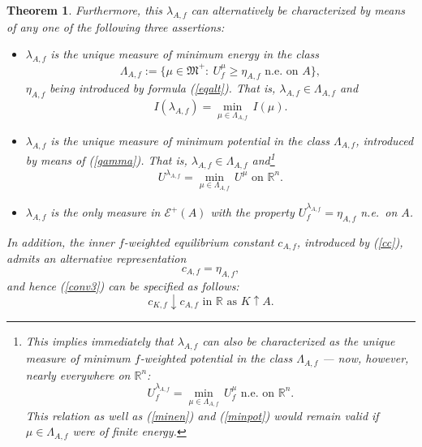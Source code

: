 \documentclass[12pt,a4paper,reqno]{amsart} %
\theoremstyle{lause}
\theoremstyle{maaritelma}
\theoremstyle{lause}
\newtheorem{theorem}{Theorem}[section]
\theoremstyle{maaritelma}
\numberwithin{equation}{section}
\begin{document}
\begin{theorem}
Furthermore, this $\lambda_{A,f}$ can alternatively be characterized by means of any one of the following three assertions:
\begin{itemize}
\item[{\rm(i)}] $\lambda_{A,f}$ is the unique measure of minimum energy in the class
\begin{equation}\label{gamma}
\Lambda_{A,f}:=\bigl\{\mu\in\mathfrak M^+: \ U^\mu_f\geqslant\eta_{A,f}\text{ \ n.e.\ on\ $A$}\bigr\},
  \end{equation}
$\eta_{A,f}$ being introduced by formula {\rm(\ref{eqalt})}. That is, $\lambda_{A,f}\in\Lambda_{A,f}$ and
\begin{equation}\label{minen}
I(\lambda_{A,f})=\min_{\mu\in\Lambda_{A,f}}\,I(\mu).
\end{equation}
\item[{\rm(ii)}] $\lambda_{A,f}$ is the unique measure of minimum potential in the class $\Lambda_{A,f}$, introduced by means of {\rm(\ref{gamma})}. That is, $\lambda_{A,f}\in\Lambda_{A,f}$ and\footnote{This implies immediately that
$\lambda_{A,f}$ can also be characterized as the unique measure of minimum $f$-we\-i\-g\-h\-t\-ed potential in the class $\Lambda_{A,f}$ --- now, however, nearly everywhere on $\mathbb R^n$: \begin{equation*} U^{\lambda_{A,f}}_f=\min_{\mu\in\Lambda_{A,f}}\,U^\mu_f\text{ \ n.e.\ on\ $\mathbb R^n$}.\end{equation*}
This relation as well as (\ref{minen}) and (\ref{minpot}) would remain valid if $\mu\in\Lambda_{A,f}$ were of finite energy.}
\begin{equation}\label{minpot}
U^{\lambda_{A,f}}=\min_{\mu\in\Lambda_{A,f}}\,U^\mu\text{ \ on\ $\mathbb R^n$}.
\end{equation}
\item[{\rm(iii)}] $\lambda_{A,f}$ is the only measure in $\mathcal E^+(A)$ with the property
$U^{\lambda_{A,f}}_f=\eta_{A,f}$ n.e.\ on $A$.
\end{itemize}

In addition, the inner $f$-weighted equilibrium constant $c_{A,f}$, introduced by {\rm(\ref{cc})}, admits an alternative representation
\begin{equation}\label{const-alt}c_{A,f}=\eta_{A,f},\end{equation}
and hence {\rm(\ref{conv3})} can be specified as follows:
\begin{equation}\label{conv3'}c_{K,f}\downarrow c_{A,f}\text{ \ in $\mathbb R$ as $K\uparrow A$}.\end{equation}
\end{theorem}
\end{document}
